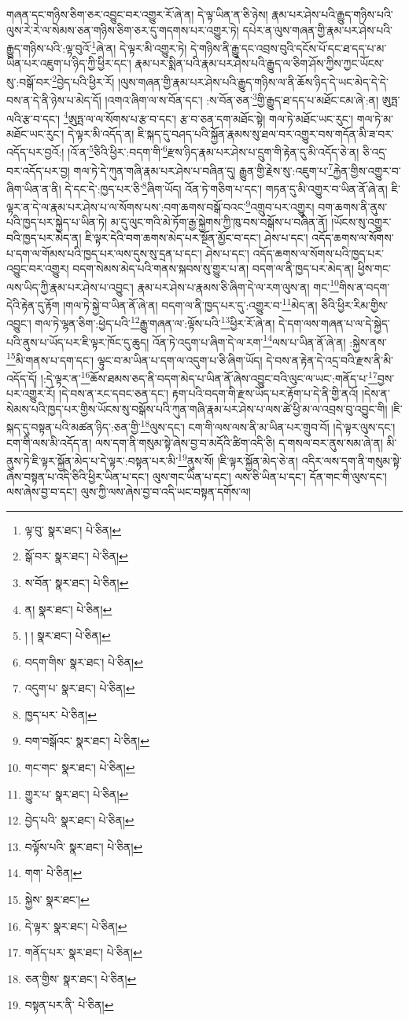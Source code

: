 གཞན་དང་གཉིས་ཅིག་ཅར་འབྱུང་བར་འགྱུར་རོ་ཞེ་ན། དེ་ལྟ་ཡིན་ན་ཅི་ཉེས། རྣམ་པར་ཤེས་པའི་རྒྱུད་གཉིས་པའི་ལུས་རེ་རེ་ལ་སེམས་ཅན་གཉིས་ཅིག་ཅར་དུ་གདགས་པར་འགྱུར་ཏེ། དཔེར་ན་ལུས་གཞན་གྱི་རྣམ་པར་ཤེས་པའི་རྒྱུད་གཉིས་པའི་:ལྟ་བུའོ་\footnote{ལྟ་བུ་  སྣར་ཐང་།  པེ་ཅིན། }ཞེ་ན། དེ་ལྟར་མི་འགྱུར་ཏེ། དེ་གཉིས་ནི་རྒྱུ་དང་འབྲས་བུའི་དངོས་པོ་དང་ཐ་དད་པ་མ་ཡིན་པར་འཇུག་པ་ཉིད་ཀྱི་ཕྱིར་དང་། རྣམ་པར་སྨིན་པའི་རྣམ་པར་ཤེས་པའི་རྒྱུད་ལ་ཅིག་ཤོས་ཀྱིས་ཀྱང་ཡོངས་སུ་:བསྒོ་བར་\footnote{སྒོ་བར་  སྣར་ཐང་།  པེ་ཅིན། }བྱེད་པའི་ཕྱིར་རོ། །ལུས་གཞན་གྱི་རྣམ་པར་ཤེས་པའི་རྒྱུད་གཉིས་ལ་ནི་ཆོས་ཉིད་དེ་ཡང་མེད་དེ་དེ་བས་ན་དེ་ནི་ཉེས་པ་མེད་དོ། །འགའ་ཞིག་ལ་ས་བོན་དང་། :ས་བོན་ཅན་\footnote{ས་བོན་  སྣར་ཐང་།  པེ་ཅིན། }གྱི་རྒྱུད་ཐ་དད་པ་མཐོང་ངམ་ཞེ་:ན། ཨུཏྤ་ལའི་རྩ་བ་དང་། \footnote{ན།    སྣར་ཐང་།  པེ་ཅིན། }ཨུཏྤ་ལ་ལ་སོགས་པ་རྩ་བ་དང་། རྩ་བ་ཅན་དག་མཐོང་སྟེ། གལ་ཏེ་མཐོང་ཡང་རུང་། གལ་ཏེ་མ་མཐོང་ཡང་རུང་། དེ་ལྟར་མི་འདོད་ན། ཇི་སྐད་དུ་བཤད་པའི་སྐྱོན་རྣམས་སུ་ཐལ་བར་འགྱུར་བས་གདོན་མི་ཟ་བར་འདོད་པར་བྱའོ:། །འོ་ན་\footnote{། །  སྣར་ཐང་།  པེ་ཅིན། }ཅིའི་ཕྱིར་:བདག་གི་\footnote{བདག་གིས་  སྣར་ཐང་།  པེ་ཅིན། }རྫས་ཉིད་རྣམ་པར་ཤེས་པ་དྲུག་གི་རྟེན་དུ་མི་འདོད་ཅེ་ན། ཅི་འདྲ་བར་འདོད་པར་བྱ། གལ་ཏེ་དེ་ཀུན་གཞི་རྣམ་པར་ཤེས་པ་བཞིན་དུ། རྒྱུན་གྱི་རྗེས་སུ་:འཇུག་པ་\footnote{འདུག་པ་  སྣར་ཐང་།  པེ་ཅིན། }རྐྱེན་གྱིས་འགྱུར་བ་ཞིག་ཡིན་ན་ནི། དེ་དང་དེ་:ཁྱད་པར་ཅི་\footnote{ཁྱད་པར་  པེ་ཅིན། }ཞིག་ཡོད། འོན་ཏེ་གཅིག་པ་དང་། གཏན་དུ་མི་འགྱུར་བ་ཡིན་ནོ་ཞེ་ན། ཇི་ལྟར་ན་དེ་ལ་རྣམ་པར་ཤེས་པ་ལ་སོགས་པས་:བག་ཆགས་བསྒོ་བའང་\footnote{བག་བསྒོའང་  སྣར་ཐང་།  པེ་ཅིན། }འགྲུབ་པར་འགྱུར། བག་ཆགས་ནི་ནུས་པའི་ཁྱད་པར་སྐྱེད་པ་ཡིན་ཏེ། མ་དུ་ལུང་གའི་མེ་ཏོག་རྒྱ་སྐྱེགས་ཀྱི་ཁུ་བས་བསྒོས་པ་བཞིན་ནོ། །ཡོངས་སུ་འགྱུར་བའི་ཁྱད་པར་མེད་ན། ཇི་ལྟར་དེའི་བག་ཆགས་མེད་པར་སྔོན་མྱོང་བ་དང་། ཤེས་པ་དང་། འདོད་ཆགས་ལ་སོགས་པ་དག་ལ་གོམས་པའི་ཁྱད་པར་ལས་དུས་སུ་དྲན་པ་དང་། ཤེས་པ་དང་། འདོད་ཆགས་ལ་སོགས་པའི་ཁྱད་པར་འབྱུང་བར་འགྱུར། བདག་སེམས་མེད་པའི་གནས་སྐབས་སུ་གྱུར་པ་ན། བདག་ལ་ནི་ཁྱད་པར་མེད་ན། ཕྱིས་གང་ལས་ཡིད་ཀྱི་རྣམ་པར་ཤེས་པ་འབྱུང་། རྣམ་པར་ཤེས་པ་རྣམས་ཅི་ཞིག་དེ་ལ་རག་ལུས་ན། གང་\footnote{གང་གང་  སྣར་ཐང་།  པེ་ཅིན། }གིས་ན་བདག་དེའི་རྟེན་དུ་རྟོག །གལ་ཏེ་སྐྱེ་བ་ཡིན་ནོ་ཞེ་ན། བདག་ལ་ནི་ཁྱད་པར་དུ་:འགྱུར་བ་\footnote{གྱུར་པ་  སྣར་ཐང་།  པེ་ཅིན། }མེད་ན། ཅིའི་ཕྱིར་རིམ་གྱིས་འབྱུང་། གལ་ཏེ་ལྷན་ཅིག་:ཕྱེད་པའི་\footnote{བྱེད་པའི་  སྣར་ཐང་།  པེ་ཅིན། }རྒྱུ་གཞན་ལ་:ལྟོས་པའི་\footnote{བལྟོས་པའི་  སྣར་ཐང་།  པེ་ཅིན། }ཕྱིར་རོ་ཞེ་ན། དེ་དག་ལས་གཞན་པ་ལ་དེ་སྐྱེད་པའི་ནུས་པ་ཡོད་པར་ཇི་ལྟར་ཁོང་དུ་ཆུད། འོན་ཏེ་འདུག་པ་ཞིག་དེ་ལ་རག་\footnote{གག་  པེ་ཅིན། }ལས་པ་ཡིན་ནོ་ཞེ་ན། :སྐྱེས་ནས་\footnote{སྐྱེས་  སྣར་ཐང་། }མི་གནས་པ་དག་དང་། ལྟུང་བ་མ་ཡིན་པ་དག་ལ་འདུག་པ་ཅི་ཞིག་ཡོད། དེ་བས་ན་རྟེན་དེ་འདྲ་བའི་རྫས་ནི་མི་འདོད་དོ། །:དེ་ལྟར་ན་\footnote{དེ་ལྟར་  སྣར་ཐང་།  པེ་ཅིན། }ཆོས་ཐམས་ཅད་ནི་བདག་མེད་པ་ཡིན་ནོ་ཞེས་འབྱུང་བའི་ལུང་ལ་ཡང་:གནོད་པ་\footnote{གནོད་པར་  སྣར་ཐང་།  པེ་ཅིན། }བྱས་པར་འགྱུར་རོ། །དེ་བས་ན་རང་དབང་ཅན་དང་། རྟག་པའི་བདག་གི་རྫས་ཡོད་པར་རྟོག་པ་དེ་ནི་གྱི་ནའོ། །དེས་ན་སེམས་པའི་ཁྱད་པར་གྱིས་ཡོངས་སུ་བསྒོས་པའི་ཀུན་གཞི་རྣམ་པར་ཤེས་པ་ལས་ཚེ་ཕྱི་མ་ལ་འབྲས་བུ་འབྱུང་གི། །ཇི་སྐད་དུ་བསྟན་པའི་མཚན་ཉིད་:ཅན་གྱི་\footnote{ཅན་གྱིས་  སྣར་ཐང་།  པེ་ཅིན། }ལུས་དང་། ངག་གི་ལས་ལས་ནི་མ་ཡིན་པར་གྲུབ་བོ། །དེ་ལྟར་ལུས་དང་། ངག་གི་ལས་མི་འདོད་ན། ལས་དག་ནི་གསུམ་སྟེ་ཞེས་བྱ་བ་མདོའི་ཚིག་འདི་ཅི། ད་གསལ་བར་ནུས་སམ་ཞེ་ན། མི་ནུས་ཏེ་ཇི་ལྟར་སྐྱོན་མེད་པ་དེ་ལྟར་:བསྟན་པར་མི་\footnote{བསྟན་པར་ནི་  པེ་ཅིན། }ནུས་སོ། །ཇི་ལྟར་སྐྱོན་མེད་ཅེ་ན། འདིར་ལས་དག་ནི་གསུམ་སྟེ་ཞེས་བསྟན་པ་འདི་ཅིའི་ཕྱིར་ཡིན་པ་དང་། ལུས་གང་ཡིན་པ་དང་། ལས་ཅི་ཡིན་པ་དང་། དོན་གང་གི་ལུས་དང་། ལས་ཞེས་བྱ་བ་དང་། ལུས་ཀྱི་ལས་ཞེས་བྱ་བ་འདི་ཡང་བསྟན་དགོས་ལ། 